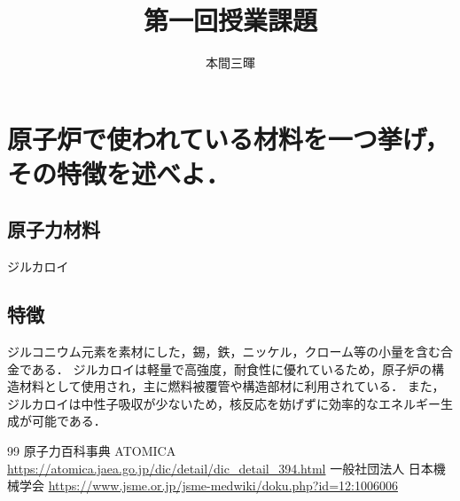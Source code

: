 \documentclass[titlepage,a4paper]{jsarticle}
\title{第一回授業課題}
\author{本間三暉}
\begin{document}
\maketitle

\section{原子炉で使われている材料を一つ挙げ，その特徴を述べよ．}
\subsection{原子力材料}
ジルカロイ
\subsection{特徴}
ジルコニウム元素を素材にした，錫，鉄，ニッケル，クローム等の小量を含む合金である．
ジルカロイは軽量で高強度，耐食性に優れているため，原子炉の構造材料として使用され，主に燃料被覆管や構造部材に利用されている．
また，ジルカロイは中性子吸収が少ないため，核反応を妨げずに効率的なエネルギー生成が可能である．

\begin{thebibliography}{99}
原子力百科事典 ATOMICA \url{https://atomica.jaea.go.jp/dic/detail/dic_detail_394.html}
一般社団法人 日本機械学会 \url{https://www.jsme.or.jp/jsme-medwiki/doku.php?id=12:1006006}

\end{thebibliography}
\end{document}
